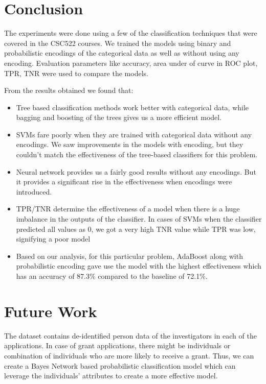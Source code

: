 \documentclass{article} %
\begin{document}
	\section{Conclusion}
	The experiments were done using a few of the classification techniques that were covered in the CSC522 courses. We trained the models using binary and probabilistic encodings of the categorical data as well as without using any encoding. Evaluation parameters like accuracy, area under of curve in ROC plot, TPR, TNR were used to compare the models.
	
	From the results obtained we found that:
	
	\begin{itemize}
		\item Tree based classification methods work better with categorical data, while bagging and boosting of the trees gives us a more efficient model.
		\item SVMs fare poorly when they are trained with categorical data without any encodings. We saw improvements in the models with encoding, but they couldn't match the effectiveness of the tree-based classifiers for this problem.
		\item Neural network provides us a fairly good results without any encodings. But it provides a significant rise in the effectiveness when encodings were introduced.
		\item TPR/TNR determine the effectiveness of a model when there is a huge imbalance in the outputs of the classifier. In cases of SVMs when the classifier predicted all values as 0, we got a very high TNR value while TPR was low, signifying a poor model
		\item Based on our analysis, for this particular problem, AdaBoost along with probabilistic encoding gave use the model with the highest effectiveness which has an accuracy of 87.3\% compared to the baseline of 72.1\%.
	\end{itemize}
	
	\section{Future Work}
	The dataset contains de-identified person data of the investigators in each of the applications. In case of grant applications, there might be individuals or combination of individuals who are more likely to receive a grant. Thus,  we can create a Bayes Network based probabilistic classification model which can leverage the individuals' attributes to create a more effective model.  
	
\end{document}
